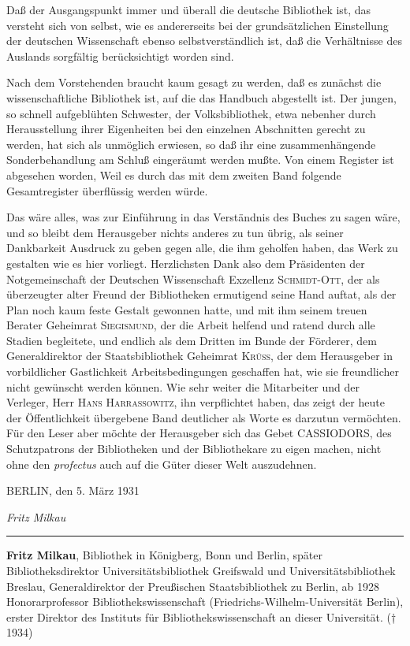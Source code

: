 \documentclass[a4paper,
fontsize=11pt,
oneside,
numbers=noperiodatend,
parskip=half-,
bibliography=totoc,
final
]{scrartcl}
\begin{document}
Daß der Ausgangspunkt immer und überall die deutsche Bibliothek ist, das
versteht sich von selbst, wie es andererseits bei der grundsätzlichen
Einstellung der deutschen Wissenschaft ebenso selbstverständlich ist,
daß die Verhältnisse des Auslands sorgfältig berücksichtigt worden sind.

Nach dem Vorstehenden braucht kaum gesagt zu werden, daß es zunächst die
wissenschaftliche Bibliothek ist, auf die das Handbuch abgestellt ist.
Der jungen, so schnell aufgeblühten Schwester, der Volksbibliothek, etwa
nebenher durch Herausstellung ihrer Eigenheiten bei den einzelnen
Abschnitten gerecht zu werden, hat sich als unmöglich erwiesen, so daß
ihr eine zusammenhängende Sonderbehandlung am Schluß eingeräumt werden
mußte. Von einem Register ist abgesehen worden, Weil es durch das mit
dem zweiten Band folgende Gesamtregister überflüssig werden würde.

Das wäre alles, was zur Einführung in das Verständnis des Buches zu
sagen wäre, und so bleibt dem Herausgeber nichts anderes zu tun übrig,
als seiner Dankbarkeit Ausdruck zu geben gegen alle, die ihm geholfen
haben, das Werk zu gestalten wie es hier vorliegt. Herzlichsten Dank
also dem Präsidenten der Notgemeinschaft der Deutschen Wissenschaft
Exzellenz \textsc{Schmidt-Ott}, der als überzeugter alter Freund der
Bibliotheken ermutigend seine Hand auftat, als der Plan noch kaum feste
Gestalt gewonnen hatte, und mit ihm seinem treuen Berater Geheimrat
\textsc{Siegismund}, der die Arbeit helfend und ratend durch alle
Stadien begleitete, und endlich als dem Dritten im Bunde der Förderer,
dem Generaldirektor der Staatsbibliothek Geheimrat \textsc{Krüss}, der
dem Herausgeber in vorbildlicher Gastlichkeit Arbeitsbedingungen
geschaffen hat, wie sie freundlicher nicht gewünscht werden können. Wie
sehr weiter die Mitarbeiter und der Verleger, Herr \textsc{Hans
Harrassowitz}, ihn verpflichtet haben, das zeigt der heute der
Öffentlichkeit übergebene Band deutlicher als Worte es darzutun
vermöchten. Für den Leser aber möchte der Herausgeber sich das Gebet
CASSIODORS, des Schutzpatrons der Bibliotheken und der Bibliothekare zu
eigen machen, nicht ohne den \emph{profectus} auch auf die Güter dieser
Welt auszudehnen.

BERLIN, den 5. März 1931

\emph{Fritz Milkau}

\begin{center}\rule{0.5\linewidth}{\linethickness}\end{center}

\textbf{Fritz Milkau}, Bibliothek in Königberg, Bonn und Berlin, später
Bibliotheksdirektor Universitätsbibliothek Greifswald und
Universitätsbibliothek Breslau, Generaldirektor der Preußischen
Staatsbibliothek zu Berlin, ab 1928 Honorarprofessor
Bibliothekswissenschaft (Friedrichs-Wilhelm-Universität Berlin), erster
Direktor des Instituts für Bibliothekswissenschaft an dieser
Universität. († 1934)
\end{document}
